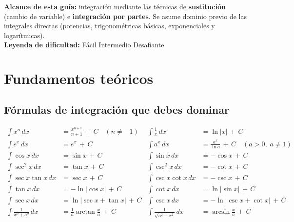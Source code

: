 \documentclass[12pt, letterpaper]{article}
\newcommand{\dx}{\,dx}
\newcommand{\CC}{\,+\,C}
\begin{document}


\vspace{4pt}
\begin{cuadroinfo}
\small
\textbf{Alcance de esta guía:} integración mediante las técnicas de \textbf{sustitución}
(cambio de variable) e \textbf{integración por partes}. Se asume dominio previo de
las integrales directas (potencias, trigonométricas básicas, exponenciales y logarítmicas).\\[4pt]
\textbf{Leyenda de dificultad:}\quad
\facil{} Fácil\quad
\medio{} Intermedio\quad
\dificil{} Desafiante
\end{cuadroinfo}

\vspace{8pt}

\section{Fundamentos teóricos}

\subsection{Fórmulas de integración que debes dominar}

\begin{cuadroteoria}
\begin{align*}
  \int x^n \dx &= \frac{x^{n+1}}{n+1} \CC \quad (n \neq -1) &
  \int \frac{1}{x} \dx &= \ln|x| \CC \\[6pt]
  \int e^x \dx &= e^x \CC &
  \int a^x \dx &= \frac{a^x}{\ln a} \CC \quad (a>0,\; a\neq 1) \\[6pt]
  \int \cos x \dx  &= \sin x \CC  &
  \int \sin x \dx  &= -\cos x \CC \\[6pt]
  \int \sec^2 x \dx &= \tan x \CC &
  \int \csc^2 x \dx &= -\cot x \CC \\[6pt]
  \int \sec x\tan x \dx &= \sec x \CC &
  \int \csc x\cot x \dx &= -\csc x \CC \\[6pt]
  \int \tan x \dx &= -\ln|\cos x| \CC &
  \int \cot x \dx &= \ln|\sin x| \CC \\[6pt]
  \int \sec x \dx &= \ln|\sec x + \tan x| \CC &
  \int \csc x \dx &= -\ln|\csc x + \cot x| \CC \\[6pt]
  \int \frac{1}{x^2+a^2}\dx &= \frac{1}{a}\arctan\frac{x}{a}\CC &
  \int \frac{1}{\sqrt{a^2-x^2}}\dx &= \arcsin\frac{x}{a}\CC
\end{align*}
\end{cuadroteoria}
\end{document}
